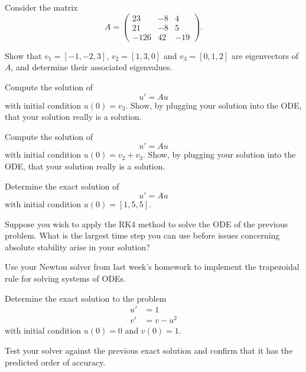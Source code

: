 \documentclass[minion]{homework}
\begin{document}
\begin{problems}

\problem Consider the matrix
\[
A = \begin{pmatrix} 
23 & -8 & 4\\
21 & -8 & 5\\
-126 & 42 & -19\end{pmatrix}.
\]
\begin{subproblems}
\item Show that $v_1=[-1,-2, 3]$,  $v_2=[1, 3 , 0]$ and 
$v_3=[0,1,2]$ are eigenvectors of $A$, and determine their
associated eigenvalues.
\item Compute the solution of
\[
u'=Au
\]
with initial condition $u(0)=v_3$.  Show, by plugging your solution
into the ODE, that your solution really is a solution.
\item Compute the solution of
\[
u'=Au
\]
with initial condition $u(0)=v_2+v_3$.  Show, by plugging your solution
into the ODE, that your solution really is a solution.
\item Determine the exact solution of
\[
u'=Au
\]
with initial condition $u(0) = [1,5,5]$.
\end{subproblems}

\problem Suppose you wish to apply the RK4 method to solve the ODE
of the previous problem.  What is the largest time step you can use before 
issues concerning absolute stability arise in your solution?

\problem
\begin{subproblems} 
\item Use your Newton solver from last week's homework to implement
the trapezoidal rule for solving systems of ODEs.  
\item Determine the exact solution to the problem
\begin{equation}
\begin{aligned}
u' &= 1\\
v' &= v - u^2
\end{aligned}
\end{equation}
with initial condition $u(0)=0$ and $v(0)=1$.
\item Test your solver against the previous exact solution
and confirm that it has the predicted order of accuracy.
\end{subproblems}


\end{problems}
\end{document}
